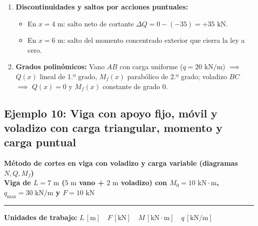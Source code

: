 {\begin{enumerate}
\begin{itemize}
              \end{itemize}

        \item \textbf{Discontinuidades y saltos por acciones puntuales:}

              \begin{itemize}

                  \item En $x = 4\text{ m}$: salto neto de cortante $\Delta Q = 0 - (-35) = +35\text{ kN}$.

                  \item En $x = 6\text{ m}$: salto del momento concentrado exterior que cierra la ley a cero.

              \end{itemize}

        \item \textbf{Grados polinómicos:} Vano $AB$ con carga uniforme ($q = 20\text{ kN/m}$) $\implies$ $Q(x)$ lineal de 1.º grado, $M_f(x)$ parabólico de 2.º grado; voladizo $BC$ $\implies$ $Q(x) = 0$ y $M_f(x)$ constante de grado 0.

    \end{enumerate}

}





\subsection{Ejemplo 10: Viga con apoyo fijo, móvil y voladizo con carga triangular, momento y carga puntual}



\begin{tcolorbox}[colback=blue!3!white, colframe=blue!40!black, arc=3pt, boxrule=0.8pt, left=8pt, right=8pt, top=6pt, bottom=6pt]

    \centering

    {\Large\bfseries\color{blue!60!black} Método de cortes en viga con voladizo y carga variable (diagramas $N, Q, M_f$)}\\[2pt]

    {\normalsize\bfseries Viga de $L = 7\text{ m}$ ($5\text{ m}$ vano + $2\text{ m}$ voladizo) con $M_0 = 10\text{ kN}\cdot\text{m}$, $q_{\max} = 30\text{ kN/m}$ y $F = 10\text{ kN}$}



    \vspace{4pt}\hrule\vspace{4pt}

    {\small\textbf{Unidades de trabajo:} $L\,[\text{m}] \quad F\,[\text{kN}] \quad M\,[\text{kN}\cdot\text{m}] \quad q\,[\text{kN/m}]$}

\end{tcolorbox}



